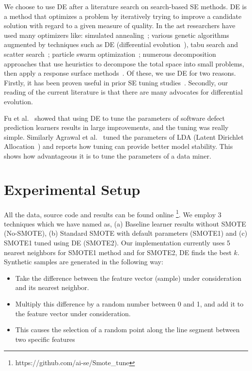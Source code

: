 \documentclass[10pt,conference]{IEEEtran}
\newcommand{\bi}{\begin{itemize}[leftmargin=0.4cm]}
\newcommand{\ei}{\end{itemize}}
\theoremstyle{break}
\theoremstyle{break}
\begin{document}
We choose to use DE after a literature search on search-based SE methods. DE is a method that optimizes a problem by iteratively trying to improve a candidate solution with regard to a given measure of quality.
In the ast researchers have used many optimizers like: simulated
annealing~\cite{feather2002converging, menzies2007business}; various genetic
algorithms~\cite{goldberg1979complexity} augmented by techniques such as
DE (differential evolution~\cite{storn1997differential}), tabu search and scatter
search~\cite{glover1986general, beausoleil2006moss, molina2007sspmo,nebro2008abyss}; particle swarm optimization~\cite{pan2008particle}; numerous
decomposition approaches that use heuristics to decompose the total space into
small problems, then apply a response surface methods~\cite{krall2015gale, zuluaga2013active}.
Of these, we use DE for two reasons. Firstly, it has been proven useful in prior SE tuning
studies~\cite{fu2016tuning, agrawal2016wrong}. Secondly, our reading of the current literature is
that there are many advocates for differential evolution.

Fu et al.~\cite{fu2016tuning} showed that using DE to tune the parameters of software defect prediction learners results in large improvements, and the tuning was really simple. Similarly Agrawal et al.~\cite{agrawal2016wrong} tuned the parameters of LDA (Latent Dirichlet Allocation~\cite{blei2003latent}) and reports how tuning can provide better model stability. This shows how advantageous it is to tune the parameters of a data miner.

\section{Experimental Setup}
\label{sect:experiment}

All the data, source code and results can be found online%
\footnote{https://github.com/ai-se/Smote\_tune}.
We employ 3 techniques which we have named as, (a) Baseline learner results without SMOTE (No-SMOTE), (b) Standard SMOTE with default parameters (SMOTE1) and (c) SMOTE1 tuned using DE (SMOTE2).  Our implementation currently uses 5 nearest neighbors for SMOTE1 method and for SMOTE2, DE finds the best $k$. Synthetic samples
are generated in the following way:
\bi
\item
Take the difference between the feature vector (sample)
under consideration and its nearest neighbor.
\item
Multiply this difference by a random number
between 0 and 1, and add it to the feature vector under consideration.
\item
This causes the
selection of a random point along the line segment between two specific features
\ei
\end{document}
